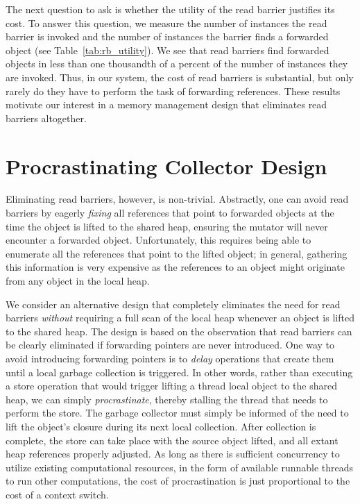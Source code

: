 The next question to ask is whether the utility of the read barrier justifies
its cost. To answer this question, we measure the number of instances the read
barrier is invoked and the number of instances the barrier finds a forwarded
object (see Table~\ref{tab:rb_utility}).  We see that read barriers find
forwarded objects in less than one thousandth of a percent of the number of
instances they are invoked. Thus, in our system, the cost of read barriers is
substantial, but only rarely do they have to perform the task of forwarding
references. These results motivate our interest in a memory management design
that eliminates read barriers altogether.

\section{Procrastinating Collector Design}

Eliminating read barriers, however, is non-trivial. Abstractly, one can avoid
read barriers by eagerly \emph{fixing} all references that point to forwarded
objects at the time the object is lifted to the shared heap, ensuring the
mutator will never encounter a forwarded object. Unfortunately, this requires
being able to enumerate all the references that point to the lifted object; in
general, gathering this information is very expensive as the references to an
object might originate from any object in the local heap.

We consider an alternative design that completely eliminates the need for read
barriers \emph{without} requiring a full scan of the local heap whenever an
object is lifted to the shared heap.  The design is based on the observation
that read barriers can be clearly eliminated if forwarding pointers are never
introduced.  One way to avoid introducing forwarding pointers is to
\emph{delay} operations that create them until a local garbage collection is
triggered.  In other words, rather than executing a store operation that would
trigger lifting a thread local object to the shared heap, we can simply
\emph{procrastinate}, thereby stalling the thread that needs to perform the
store.  The garbage collector must simply be informed of the need to lift the
object's closure during its next local collection. After collection is
complete, the store can take place with the source object lifted, and all
extant heap references properly adjusted.  As long as there is sufficient
concurrency to utilize existing computational resources, in the form of
available runnable threads to run other computations, the cost of
procrastination is just proportional to the cost of a context switch.

